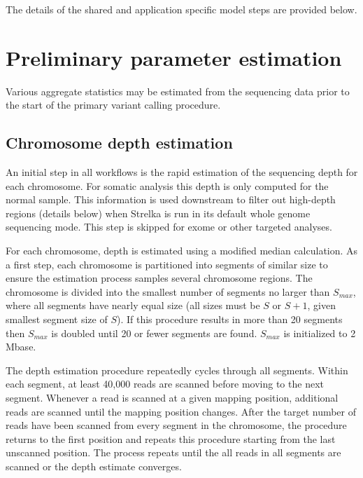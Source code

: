 \documentclass{article}
\begin{document}
The details of the shared and application specific model steps are provided below.


\section{Preliminary parameter estimation}

Various aggregate statistics may be estimated from the sequencing data prior to the start of the primary variant calling procedure.

\subsection{Chromosome depth estimation}
\label{sec:depth_est}

An initial step in all workflows is the rapid estimation of the sequencing depth for each chromosome. For somatic analysis this depth is only computed for the normal sample. This information is used downstream to filter out high-depth regions (details below) when Strelka is run in its default whole genome sequencing mode. This step is skipped for exome or other targeted analyses.

For each chromosome, depth is estimated using a modified median calculation. As a first step, each chromosome is partitioned into segments of similar size to ensure the estimation process samples several chromosome regions. The chromosome is divided into the smallest number of segments no larger than $S_{max}$, where all segments have nearly equal size (all sizes must be $S$ or $S+1$, given smallest segment size of $S$). If this procedure results in more than 20 segments then $S_{max}$ is doubled until 20 or fewer segments are found. $S_{max}$ is initialized to 2 Mbase.

The depth estimation procedure repeatedly cycles through all segments. Within each segment, at least 40,000 reads are scanned before moving to the next segment. Whenever a read is scanned at a given mapping position, additional reads are scanned until the mapping position changes. After the target number of reads have been scanned from every segment in the chromosome, the procedure returns to the first position and repeats this procedure starting from the last unscanned position. The process repeats until the all reads in all segments are scanned or the depth estimate converges.
\end{document}
